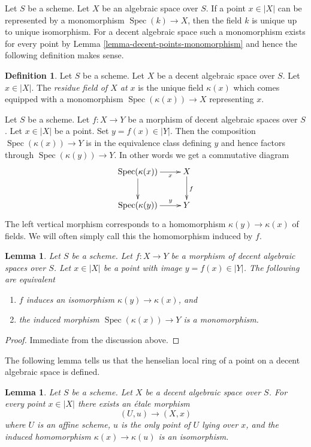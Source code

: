 \documentclass{stacks-project}
\theoremstyle{plain}
\newtheorem{lemma}[subsection]{Lemma}
\theoremstyle{definition}
\newtheorem{definition}[subsection]{Definition}
\theoremstyle{remark}
\numberwithin{equation}{subsection}
\def\Spec{\mathop{\mathrm{Spec}}}
\begin{document}
\noindent
Let $S$ be a scheme. Let $X$ be an algebraic space over $S$.
If a point $x \in |X|$ can be represented by a monomorphism
$\Spec(k) \to X$, then the field $k$ is unique up to unique
isomorphism. For a decent
algebraic space such a monomorphism exists for every point
by Lemma \ref{lemma-decent-points-monomorphism}
and hence the following definition makes sense.

\begin{definition}
\label{definition-residue-field}
Let $S$ be a scheme. Let $X$ be a decent algebraic space over $S$.
Let $x \in |X|$. The {\it residue field of $X$ at $x$}
is the unique field $\kappa(x)$ which comes equipped with a
monomorphism $\Spec(\kappa(x)) \to X$ representing $x$.
\end{definition}

\noindent
Let $S$ be a scheme. Let $f : X \to Y$ be a morphism of decent
algebraic spaces over $S$. Let $x \in |X|$ be a point.
Set $y = f(x) \in |Y|$. Then the composition $\Spec(\kappa(x)) \to Y$
is in the equivalence class defining $y$ and hence factors through
$\Spec(\kappa(y)) \to Y$. In other words we get a commutative diagram
$$
\xymatrix{
\Spec(\kappa(x)) \ar[r]_-x \ar[d] & X \ar[d]^f \\
\Spec(\kappa(y)) \ar[r]^-y & Y
}
$$
The left vertical morphism corresponds to a homomorphism
$\kappa(y) \to \kappa(x)$ of fields. We will often simply
call this the homomorphism induced by $f$.

\begin{lemma}
\label{lemma-identifies-residue-fields}
Let $S$ be a scheme. Let $f : X \to Y$ be a morphism of decent
algebraic spaces over $S$. Let $x \in |X|$ be a point
with image $y = f(x) \in |Y|$.
The following are equivalent
\begin{enumerate}
\item $f$ induces an isomorphism $\kappa(y) \to \kappa(x)$, and
\item the induced morphism $\Spec(\kappa(x)) \to Y$ is a monomorphism.
\end{enumerate}
\end{lemma}

\begin{proof}
Immediate from the discussion above.
\end{proof}

\noindent
The following lemma tells us that the henselian local ring of a point
on a decent algebraic space is defined.

\begin{lemma}
\label{lemma-decent-space-elementary-etale-neighbourhood}
Let $S$ be a scheme. Let $X$ be a decent algebraic space over $S$.
For every point $x \in |X|$ there exists an \'etale morphism
$$
(U, u) \longrightarrow (X, x)
$$
where $U$ is an affine scheme, $u$ is the only point of $U$ lying
over $x$, and the induced homomorphism $\kappa(x) \to \kappa(u)$
is an isomorphism.
\end{lemma}
\end{document}
